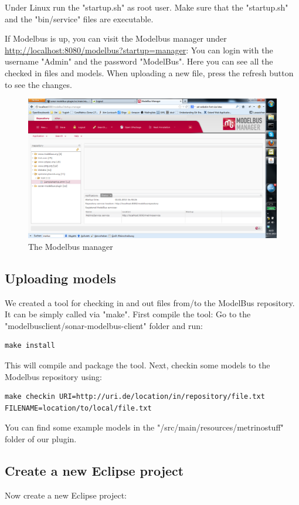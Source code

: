 Under Linux run the "startup.sh" as root user. Make sure that the "startup.sh" and the "bin/service" files are executable.

If Modelbus is up, you can visit the Modelbus manager under \url{http://localhost:8080/modelbus?startup=manager}: You can login with the username "Admin" and the password "ModelBus". Here you can see all the checked in files and models. When uploading a new file, press the refresh button to see the changes.

\begin{figure}
	\centering
		\includegraphics[width=\textwidth]{modelbusmanager}
	\caption{The Modelbus manager}
	\label{fig:modelbusmanager}
\end{figure}


\subsection{Uploading models}
We created a tool for checking in and out files from/to the ModelBus repository. It can be simply called via "make". First compile the tool: Go to the "modelbusclient/sonar-modelbus-client" folder and run:
\begin{verbatim}
make install
\end{verbatim}
This will compile and package the tool. Next, checkin some models to the Modelbus repository using:
\begin{verbatim}
make checkin URI=http://uri.de/location/in/repository/file.txt FILENAME=location/to/local/file.txt
\end{verbatim}
You can find some example models in the "/src/main/resources/metrinostuff" folder of our plugin.


\subsection{Create a new Eclipse project}
Now create a new Eclipse project:


